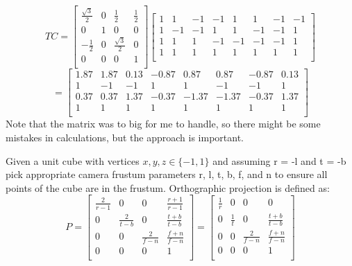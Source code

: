 \documentclass[a4paper]{article}
\begin{document}
\[
TC=\begin{bmatrix}
\frac{\sqrt{3}}{2}&0&\frac{1}{2}&\frac{1}{2}\\
0&1&0&0\\
-\frac{1}{2}&0&\frac{\sqrt{3}}{2}&0\\
0&0&0&1\\
\end{bmatrix}
\begin{bmatrix}
1&1&-1&-1&1&1&-1&-1\\
1&-1&-1&1&1&-1&-1&1\\
1&1&1&-1&-1&-1&-1&1\\
1&1&1&1&1&1&1&1\\
\end{bmatrix}
\]
\[
=\begin{bmatrix}
1.87&1.87&0.13&-0.87&0.87&0.87&-0.87&0.13\\
1&-1&-1&1&1&-1&-1&1\\
0.37&0.37&1.37&-0.37&-1.37&-1.37&-0.37&1.37\\
1&1&1&1&1&1&1&1\\
\end{bmatrix}
\]
Note that the matrix was to big for me to handle, so there might be some mistakes in calculations, but the approach is important.

Given a unit cube with vertices $x, y, z \in \{-1, 1\}$ and assuming r = -l and t = -b pick appropriate camera frustum parameters r, l, t, b, f, and n to ensure all points of the cube are in the frustum. Orthographic projection is defined as:
\[P=\begin{bmatrix}
\frac{2}{r-1}&0&0&\frac{r+1}{r-1}\\
0&\frac{2}{t-b}&0&\frac{t+b}{t-b}\\
0&0&\frac{2}{f-n}&\frac{f+n}{f-n}\\
0&0&0&1\\
\end{bmatrix}
=\begin{bmatrix}
\frac{1}{r}&0&0&0\\
0&\frac{1}{t}&0&\frac{t+b}{t-b}\\
0&0&\frac{2}{f-n}&\frac{f+n}{f-n}\\
0&0&0&1\\
\end{bmatrix}
\]
\end{document}
